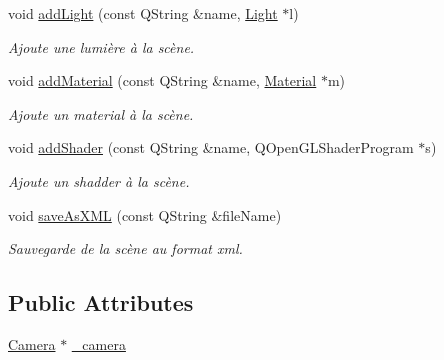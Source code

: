 \begin{DoxyCompactItemize}
void \hyperlink{class_scene_aedf1b6729e0feda58666662c349ffed1}{add\+Light} (const Q\+String \&name, \hyperlink{class_light}{Light} $\ast$l)
\begin{DoxyCompactList}\small\item\em Ajoute une lumière à la scène. \end{DoxyCompactList}\item 
void \hyperlink{class_scene_a68761479fea650973d31e2d9565f8aca}{add\+Material} (const Q\+String \&name, \hyperlink{class_material}{Material} $\ast$m)
\begin{DoxyCompactList}\small\item\em Ajoute un material à la scène. \end{DoxyCompactList}\item 
void \hyperlink{class_scene_ad15253a331423b1e3c3fb2484b10509c}{add\+Shader} (const Q\+String \&name, Q\+Open\+G\+L\+Shader\+Program $\ast$s)
\begin{DoxyCompactList}\small\item\em Ajoute un shadder à la scène. \end{DoxyCompactList}\item 
void \hyperlink{class_scene_ae87e88cbefc16640354acc8ec11b5e1e}{save\+As\+X\+M\+L} (const Q\+String \&file\+Name)
\begin{DoxyCompactList}\small\item\em Sauvegarde de la scène au format xml. \end{DoxyCompactList}\end{DoxyCompactItemize}
\subsection*{Public Attributes}
\begin{DoxyCompactItemize}
\item 
\hyperlink{class_camera}{Camera} $\ast$ \hyperlink{class_scene_a8cce9e0f96edc8655a9b9a885e2c26bf}{\+\_\+camera}
\end{DoxyCompactItemize}
